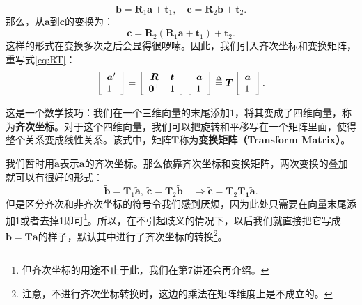 \[
\bm{b} = {\bm{R}_1} \bm{a} + {\bm{t}_1}, \quad \bm{c} = {\bm{R}_2} \bm{b} + {\bm{t}_2}.
\]
那么，从$\bm{a}$到$\bm{c}$的变换为：
\[
\bm{c} = {\bm{R}_2}\left( {{\bm{R}_1} \bm{a} + {\bm{t}_1}} \right) + {\bm{t}_2}.
\]
这样的形式在变换多次之后会显得很啰嗦。因此，我们引入齐次坐标和变换矩阵，重写式\eqref{eq:RT}：
\begin{equation}
\left[ \begin{array}{l}
\bm{a}'\\
1
\end{array} \right] = 
\left[ {\begin{array}{*{20}{c}}
	\bm{R}&\bm{t}\\
	{{\bm{0}^\mathrm{T}}}&1
	\end{array}} \right]
\left[ \begin{array}{l}
\bm{a}\\
1
\end{array} \right]  \buildrel \Delta \over = \bm{T} \left[ \begin{array}{l}
\bm{a}\\
1
\end{array} \right].
\end{equation}

这是一个数学技巧：我们在一个三维向量的末尾添加$1$，将其变成了四维向量，称为\textbf{齐次坐标}。对于这个四维向量，我们可以把旋转和平移写在一个矩阵里面，使得整个关系变成线性关系。该式中，矩阵$\bm{T}$称为\textbf{变换矩阵（Transform Matrix）}。
%
%

我们暂时用$ \tilde{ \bm{a} }$表示$\bm{a}$的齐次坐标。那么依靠齐次坐标和变换矩阵，两次变换的叠加就可以有很好的形式：
\begin{equation}
	\tilde{\bm{b}} = \bm{T}_1 \tilde{\bm{a}}, \  \tilde{\bm{c}} = \bm{T}_2 \tilde{\bm{b}} \quad \Rightarrow \tilde{\bm{c}} = \bm{T}_2 \bm{T_1} \tilde{\bm{a}}.
\end{equation}
但是区分齐次和非齐次坐标的符号令我们感到厌烦，因为此处只需要在向量末尾添加1或者去掉1即可\footnote{但齐次坐标的用途不止于此，我们在第7讲还会再介绍。}。所以，在不引起歧义的情况下，以后我们就直接把它写成$\bm{b}= \bm{T} \bm{a}$的样子，默认其中进行了齐次坐标的转换\footnote{注意，不进行齐次坐标转换时，这边的乘法在矩阵维度上是不成立的。}。

